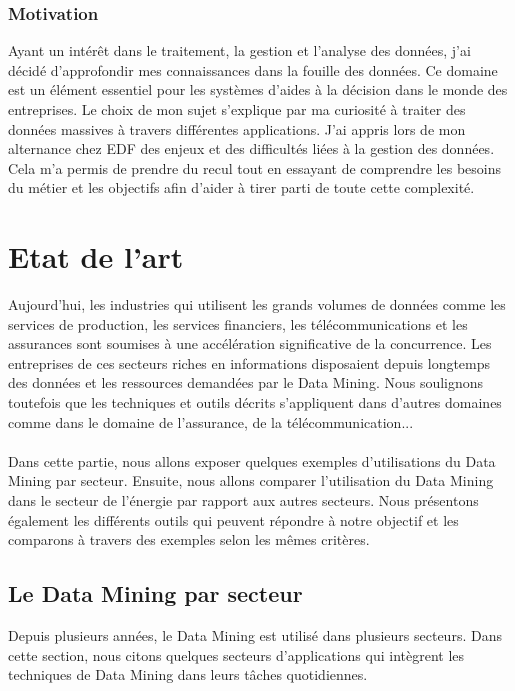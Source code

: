 \documentclass[11pt,a4paper]{report}
\begin{document}
 
\subsubsection{Motivation}
Ayant un intérêt dans le traitement, la gestion et l'analyse des données, j'ai décidé d’approfondir mes connaissances dans la fouille des données. Ce domaine est un élément essentiel pour les systèmes d'aides à la décision dans le monde des entreprises.    
Le choix de mon sujet s'explique par ma curiosité à traiter des données massives à travers différentes applications. J'ai appris lors de mon alternance chez EDF des enjeux et des difficultés liées à la gestion des données. Cela m'a permis de prendre du recul tout en essayant de comprendre les besoins du métier et les objectifs afin d'aider à tirer parti de toute cette complexité.  



\newpage

\section{Etat de l'art \label{etat_de_lart}}
%
Aujourd'hui, les industries qui utilisent les grands volumes de données comme les services de production, les services financiers, les télécommunications et les assurances sont soumises à une accélération significative de la concurrence. Les entreprises de ces secteurs riches en informations disposaient depuis longtemps des données et les ressources demandées par le Data Mining.
 Nous soulignons toutefois que les techniques et outils décrits s'appliquent dans d'autres domaines comme dans le domaine de l'assurance, de la télécommunication... \\\\
 Dans cette partie, nous allons exposer quelques exemples d'utilisations du Data Mining par secteur. Ensuite, nous allons comparer l'utilisation du Data Mining dans le secteur de l'énergie par rapport aux autres secteurs. 
 Nous présentons également les différents outils qui peuvent répondre à notre objectif et les comparons à travers des exemples selon les mêmes critères. 


 \subsection{Le Data Mining par secteur}
 Depuis plusieurs années, le Data Mining est utilisé dans plusieurs secteurs. Dans cette section, nous citons quelques secteurs d'applications qui intègrent les techniques de Data Mining dans leurs tâches quotidiennes. 
\end{document}
